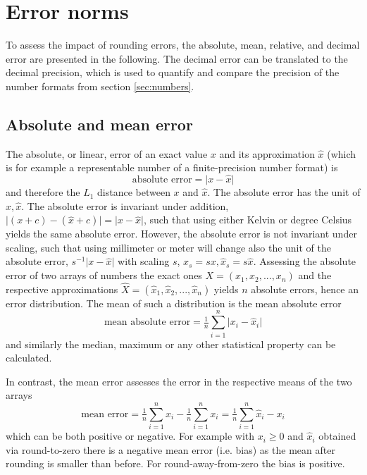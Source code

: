 \section{Error norms}
\label{sec:error_norms}

To assess the impact of rounding errors, the absolute, mean, relative, and decimal error are presented in the following.
The decimal error can be translated to the decimal precision, which is used to quantify and compare the precision of the
number formats from section \ref{sec:numbers}. 

\subsection{Absolute and mean error}
\label{sec:absmean_error}

The absolute, or linear, error of an exact value $x$ and its approximation $\hat{x}$ (which is for example a representable number of
a finite-precision number format) is 
\begin{equation}
	\text{absolute error} = \vert x - \hat{x} \vert
	\label{eq:abserror}
\end{equation}
and therefore the $L_1$ distance between $x$ and $\hat{x}$. The absolute error has the unit of $x,\hat{x}$. The absolute error is invariant
under addition, $\vert (x+c) - (\hat{x} + c)\vert = \vert x - \hat{x} \vert$, such that using either Kelvin or degree Celsius yields the same absolute error.
However, the absolute error is not invariant under scaling, such that using millimeter or meter will change also the unit of the absolute error,
$s^{-1}\vert x - \hat{x} \vert$ with scaling $s$, $x_s = sx, \hat{x}_s = s\hat{x}$. Assessing the absolute error of two arrays of numbers
the exact ones $X = (x_1,x_2,...,x_n)$ and the respective approximations $\hat{X} = (\hat{x}_1,\hat{x}_2,...,\hat{x}_n)$ yields $n$ 
absolute errors, hence an error distribution. The mean of such a distribution is the mean absolute error
\begin{equation}
	\text{mean absolute error} = \tfrac{1}{n} \sum_{i=1}^n \vert x_i - \hat{x}_i \vert
	\label{eq:meanabserror}
\end{equation}
and similarly the median, maximum or any other statistical property can be calculated.

In contrast, the mean error assesses the error in the respective means of the two arrays
\begin{equation}
	\text{mean error} = \tfrac{1}{n}\sum_{i=1}^n \hat{x}_i - \tfrac{1}{n}\sum_{i=1}^n x_i = \tfrac{1}{n} \sum_{i=1}^n \hat{x}_i - x_i
	\label{eq:meanerror}
\end{equation}
which can be both positive or negative. For example with $x_i \geq 0$ and $\hat{x}_i$ obtained via round-to-zero there is a
negative mean error (i.e. bias) as the mean after rounding is smaller than before. For round-away-from-zero the bias is
positive.

